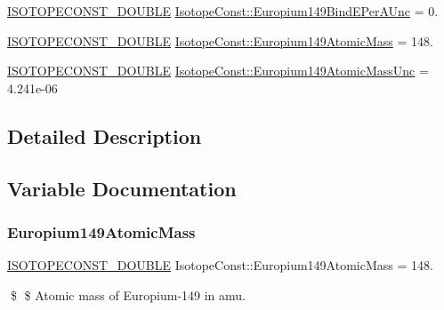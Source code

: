 \begin{DoxyCompactItemize}
\mbox{\hyperlink{group___isotope_const-_macros_ga8f45a7272ce02c0b4c65c44636ed719a}{I\+S\+O\+T\+O\+P\+E\+C\+O\+N\+S\+T\+\_\+\+D\+O\+U\+B\+LE}} \mbox{\hyperlink{group___isotope_const-_europium-_eu149_ga1d520ceb3e49e485c57691999a5e1fcc}{Isotope\+Const\+::\+Europium149\+Bind\+E\+Per\+A\+Unc}} = 0.
\item 
\mbox{\hyperlink{group___isotope_const-_macros_ga8f45a7272ce02c0b4c65c44636ed719a}{I\+S\+O\+T\+O\+P\+E\+C\+O\+N\+S\+T\+\_\+\+D\+O\+U\+B\+LE}} \mbox{\hyperlink{group___isotope_const-_europium-_eu149_ga77f13e14147403c35fe67a83751452dd}{Isotope\+Const\+::\+Europium149\+Atomic\+Mass}} = 148.
\item 
\mbox{\hyperlink{group___isotope_const-_macros_ga8f45a7272ce02c0b4c65c44636ed719a}{I\+S\+O\+T\+O\+P\+E\+C\+O\+N\+S\+T\+\_\+\+D\+O\+U\+B\+LE}} \mbox{\hyperlink{group___isotope_const-_europium-_eu149_ga3aa2e0c79fa5757fab5e2d26535497b5}{Isotope\+Const\+::\+Europium149\+Atomic\+Mass\+Unc}} = 4.\+241e-\/06
\end{DoxyCompactItemize}


\subsection{Detailed Description}


\subsection{Variable Documentation}
\mbox{\label{group___isotope_const-_europium-_eu149_ga77f13e14147403c35fe67a83751452dd}} 
\subsubsection{\texorpdfstring{Europium149\+Atomic\+Mass}{Europium149AtomicMass}}
{\footnotesize\ttfamily \mbox{\hyperlink{group___isotope_const-_macros_ga8f45a7272ce02c0b4c65c44636ed719a}{I\+S\+O\+T\+O\+P\+E\+C\+O\+N\+S\+T\+\_\+\+D\+O\+U\+B\+LE}} Isotope\+Const\+::\+Europium149\+Atomic\+Mass = 148.}

\$ \$ Atomic mass of Europium-\/149 in amu. \mbox{\label{group___isotope_const-_europium-_eu149_ga3aa2e0c79fa5757fab5e2d26535497b5}} 
